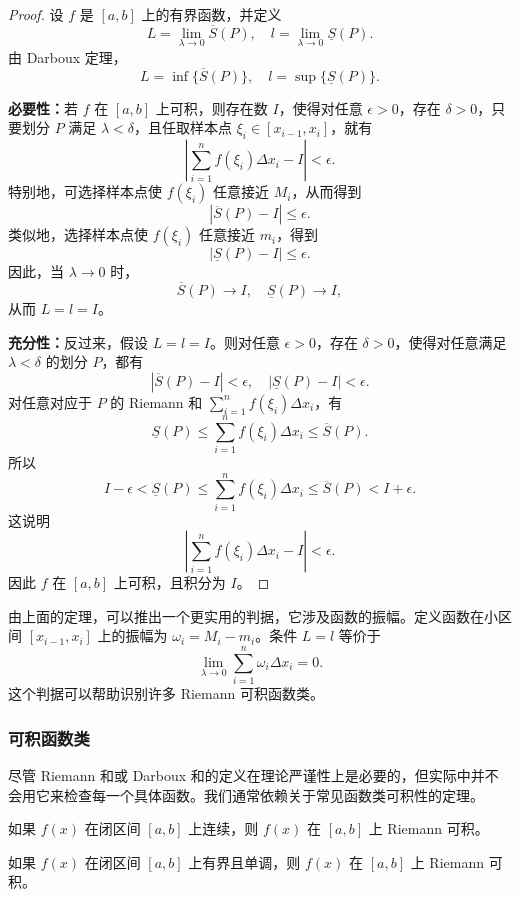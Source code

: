 \begin{proof}
设 $f$ 是 $[a,b]$ 上的有界函数，并定义
\[
L=\lim_{\lambda\to 0}\overline{S}(P),\quad l=\lim_{\lambda\to 0}\underline{S}(P).
\]
由 Darboux 定理，
\[
L=\inf\{\overline{S}(P)\},\quad l=\sup\{\underline{S}(P)\}.
\]

\noindent\textbf{必要性：}若 $f$ 在 $[a,b]$ 上可积，则存在数 $I$，使得对任意 $\epsilon>0$，存在 $\delta>0$，只要划分 $P$ 满足 $\lambda<\delta$，且任取样本点 $\xi_i\in[x_{i-1},x_i]$，就有
\[
\left|\sum_{i=1}^{n}f(\xi_i)\Delta x_i-I\right|<\epsilon.
\]
特别地，可选择样本点使 $f(\xi_i)$ 任意接近 $M_i$，从而得到
\[
|\overline{S}(P)-I|\le \epsilon.
\]
类似地，选择样本点使 $f(\xi_i)$ 任意接近 $m_i$，得到
\[
|\underline{S}(P)-I|\le \epsilon.
\]
因此，当 $\lambda\to 0$ 时，
\[
\overline{S}(P)\to I,
\quad
\underline{S}(P)\to I,
\]
从而 $L=l=I$。

\noindent\textbf{充分性：}反过来，假设 $L=l=I$。则对任意 $\epsilon>0$，存在 $\delta>0$，使得对任意满足 $\lambda<\delta$ 的划分 $P$，都有
\[
|\overline{S}(P)-I|<\epsilon,
\quad
|\underline{S}(P)-I|<\epsilon.
\]
对任意对应于 $P$ 的 Riemann 和 $\sum_{i=1}^{n}f(\xi_i)\Delta x_i$，有
\[
\underline{S}(P)\le \sum_{i=1}^{n}f(\xi_i)\Delta x_i\le \overline{S}(P).
\]
所以
\[
I-\epsilon<\underline{S}(P)\le \sum_{i=1}^{n}f(\xi_i)\Delta x_i\le \overline{S}(P)<I+\epsilon.
\]
这说明
\[
\left|\sum_{i=1}^{n}f(\xi_i)\Delta x_i-I\right|<\epsilon.
\]
因此 $f$ 在 $[a,b]$ 上可积，且积分为 $I$。
\end{proof}

由上面的定理，可以推出一个更实用的判据，它涉及函数的振幅。定义函数在小区间 $[x_{i-1},x_i]$ 上的振幅为 $\omega_i=M_i-m_i$。条件 $L=l$ 等价于
\[
\lim_{\lambda\to 0}\sum_{i=1}^{n}\omega_i\Delta x_i=0.
\]
这个判据可以帮助识别许多 Riemann 可积函数类。

\subsubsection{可积函数类}

尽管 Riemann 和或 Darboux 和的定义在理论严谨性上是必要的，但实际中并不会用它来检查每一个具体函数。我们通常依赖关于常见函数类可积性的定理。

\begin{theorem}[连续函数的可积性]
如果 $f(x)$ 在闭区间 $[a,b]$ 上连续，则 $f(x)$ 在 $[a,b]$ 上 Riemann 可积。
\end{theorem}

\begin{theorem}[单调函数的可积性]
如果 $f(x)$ 在闭区间 $[a,b]$ 上有界且单调，则 $f(x)$ 在 $[a,b]$ 上 Riemann 可积。
\end{theorem}

